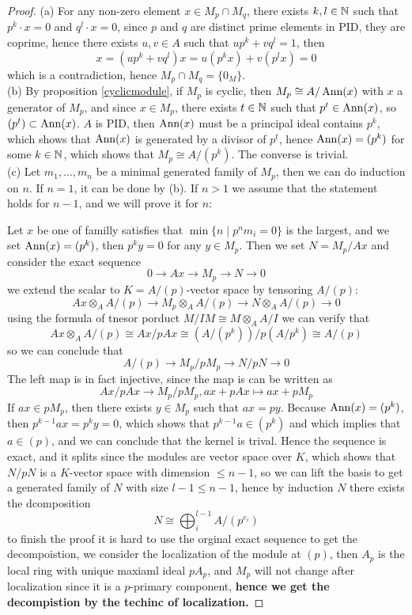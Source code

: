 \begin{proof}
    (a) For any non-zero element \(x \in M_p \cap M_q\), there exists \(k,l \in \mathbb{N}\) such that \(p^k \cdot x = 0\) and \(q^l \cdot x = 0\), since \(p\) and \(q\) are distinct prime elements in PID, they are coprime, hence there exists \(u,v \in A\) such that \(up^k + vq^l = 1\), then
    \[x = (up^k+vq^l)x =u(p^kx)+v(p^lx) = 0\]
    which is a contradiction, hence \(M_p \cap M_q = \{0_M\}\).\\

    (b) By proposition \ref{cyclicmodule}, if \(M_p\) is cyclic, then \(M_p \cong A/\operatorname{Ann}(x)\) with \(x\) a generator of \(M_p\), and since \(x \in M_p\), there exists \(t \in \mathbb{N}\) such that \(p^t \in \operatorname{Ann}(x)\), so \((p^t) \subset \operatorname{Ann}(x)\). \(A\) is PID, then \(\operatorname{Ann}(x)\) must be a principal ideal contains \(p^k\), which shows that \(\operatorname{Ann}(x)\) is generated by a divisor of \(p^t\), hence \(\operatorname{Ann}(x) = (p^k)\) for some \(k \in \mathbb{N}\), which shows that \(M_p \cong A/(p^k)\). The converse is trivial.\\

    (c) Let \({m_1,\dots,m_n}\) be a minimal generated family of \(M_p\), then we can do induction on \(n\). If \(n = 1\), it can be done by (b). If \(n>1\) we assume that the statement holds for \(n-1\), and we will prove it for \(n\):

    Let \(x\) be one of familly satisfies that \(\min\{n \mid p^nm_i = 0\}\) is the largest, and we set \(\operatorname{Ann}(x) = (p^k)\), then \(p^ky = 0\) for any \(y \in M_p\). Then we set \(N = M_p/Ax\) and consider the exact sequence
    \[0 \to Ax \to M_p \to N \to 0\]
    we extend the scalar to \(K = A/(p)\)-vector space by tensoring \(A/(p)\):
    \[Ax \otimes_A A/(p) \to M_p \otimes_A A/(p) \to N \otimes_A A/(p) \to 0\]
    using the formula of tnesor porduct \(M/IM \cong M \otimes_A A/I\) we can verify that
    \[Ax \otimes_A A/(p) \cong Ax/pAx \cong (A/(p^k))/p(A/p^k) \cong A/(p)\]
    so we can conclude that 
    \[A/(p) \to M_p/pM_p \to N/pN \to 0\]
    The left map is in fact injective, since the map is can be written as
    \[Ax/pAx \to M_p/pM_p, ax + pAx \mapsto ax + pM_p\]
    If \(ax \in pM_p\), then there exists \(y \in M_p\) such that \(ax = py\). Because \(\operatorname{Ann}(x) = (p^k)\), then \(p^{k-1}ax = p^ky = 0\), which shows that \(p^{k-1}a \in (p^k)\) and which implies that \(a \in (p)\), and we can conclude that the kernel is trival. Hence the sequence is exact, and  it splits since the modules are vector space over \(K\), which shows that \(N/pN\) is a \(K\)-vector space with dimension \(\leq n-1\), so we can lift the basis to get a generated family of \(N\) with size \(l-1 \leq n-1\), hence by induction \(N\) there exists the dcomposition 
    \[N \cong \bigoplus_i^{l-1}A/(p^{e_i})\]
    to finish the proof it is hard to use the orginal exact sequence to get the decompoistion, we consider the localization of the module at \((p)\), then \(A_p\) is the local ring with unique maxiaml ideal \(pA_p\), and \(M_p\) will not change after localization since it is a \(p\)-primary component, \textbf{hence we get the decompistion by the techinc of localization.}
\end{proof}

